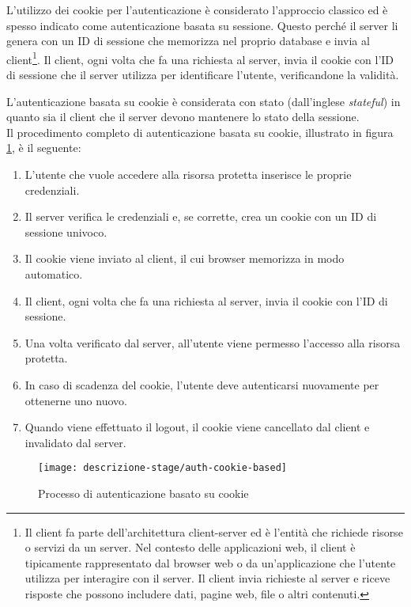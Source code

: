 L'utilizzo dei cookie per l'autenticazione è considerato l'approccio classico ed è spesso indicato come autenticazione basata su sessione. 
Questo perché il server li genera con un ID di sessione che memorizza nel proprio database e invia al client\footnote{Il client fa parte dell'architettura client-server ed è l'entità che richiede risorse o servizi da un server. Nel contesto delle applicazioni web, il client è tipicamente rappresentato dal browser web o da un'applicazione che l'utente utilizza per interagire con il server. Il client invia richieste al server e riceve risposte che possono includere dati, pagine web, file o altri contenuti.}.
Il client, ogni volta che fa una richiesta al server, invia il cookie con l'ID di sessione che il server utilizza per identificare l'utente, verificandone la validità.

L'autenticazione basata su cookie è considerata con stato (dall'inglese \emph{stateful}) in quanto sia il client che il server devono mantenere lo stato della sessione. \\

\noindent Il procedimento completo di autenticazione basata su cookie, illustrato in figura \ref{fig:auth-cookie-based}, è il seguente:
\begin{enumerate}
	\item L'utente che vuole accedere alla risorsa protetta inserisce le proprie credenziali.
	\item Il server verifica le credenziali e, se corrette, crea un cookie con un ID di sessione univoco.
	\item Il cookie viene inviato al client, il cui browser memorizza in modo automatico.
	\item Il client, ogni volta che fa una richiesta al server, invia il cookie con l'ID di sessione.
	\item Una volta verificato dal server, all'utente viene permesso l'accesso alla risorsa protetta.
	\item In caso di scadenza del cookie, l'utente deve autenticarsi nuovamente per ottenerne uno nuovo.
	\item Quando viene effettuato il logout, il cookie viene cancellato dal client e invalidato dal server.
\end{enumerate}

\begin{figure}[!ht] 
    \centering 
    \texttt{[image: descrizione-stage/auth-cookie-based]} 
    \caption{Processo di autenticazione basato su cookie}
	\label{fig:auth-cookie-based}
\end{figure}

